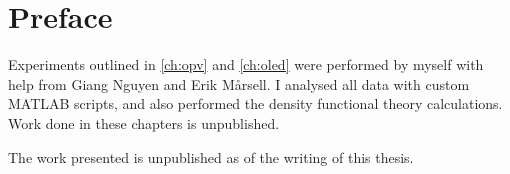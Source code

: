 
\chapter{Preface}

Experiments outlined in \autoref{ch:opv} and \autoref{ch:oled} were performed by myself with help from Giang Nguyen and Erik M\aa rsell. I analysed all data with custom MATLAB scripts, and also performed the density functional theory calculations. Work done in these chapters is unpublished.

The work presented is unpublished as of the writing of this thesis.